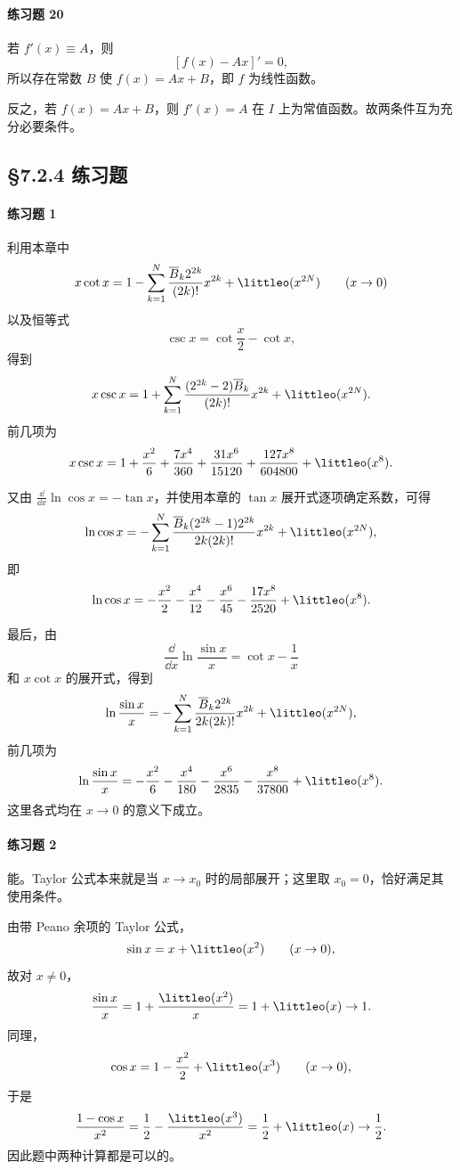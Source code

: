 \paragraph{练习题 20}
\begin{xsolution}
若 $f'(x)\equiv A$，则
\[
  [f(x)-Ax]'=0,
\]
所以存在常数 $B$ 使 $f(x)=Ax+B$，即 $f$ 为线性函数。

反之，若 $f(x)=Ax+B$，则 $f'(x)=A$ 在 $I$ 上为常值函数。故两条件互为充分必要条件。
\end{xsolution}

\subsection*{§7.2.4 练习题}

\paragraph{练习题 1}
\begin{xsolution}
利用本章中
\[
  x\cot x
  =1-\sum_{k=1}^N\frac{\overline B_k2^{2k}}{(2k)!}x^{2k}
  +\littleo(x^{2N})
  \qquad(x\to0)
\]
以及恒等式
\[
  \csc x=\cot\frac x2-\cot x,
\]
得到
\[
  x\csc x
  =1+\sum_{k=1}^N
  \frac{(2^{2k}-2)\overline B_k}{(2k)!}x^{2k}
  +\littleo(x^{2N}).
\]
前几项为
\[
  x\csc x
  =1+\frac{x^2}{6}+\frac{7x^4}{360}
  +\frac{31x^6}{15120}+\frac{127x^8}{604800}
  +\littleo(x^8).
\]

又由 $\frac{\dd}{\dd x}\ln\cos x=-\tan x$，并使用本章的 $\tan x$ 展开式逐项确定系数，可得
\[
  \ln\cos x
  =-\sum_{k=1}^N
  \frac{\overline B_k(2^{2k}-1)2^{2k}}
       {2k(2k)!}x^{2k}
  +\littleo(x^{2N}),
\]
即
\[
  \ln\cos x
  =-\frac{x^2}{2}-\frac{x^4}{12}-\frac{x^6}{45}
  -\frac{17x^8}{2520}+\littleo(x^8).
\]

最后，由
\[
  \frac{\dd}{\dd x}\ln\frac{\sin x}{x}
  =\cot x-\frac1x
\]
和 $x\cot x$ 的展开式，得到
\[
  \ln\frac{\sin x}{x}
  =-\sum_{k=1}^N
  \frac{\overline B_k2^{2k}}{2k(2k)!}x^{2k}
  +\littleo(x^{2N}),
\]
前几项为
\[
  \ln\frac{\sin x}{x}
  =-\frac{x^2}{6}-\frac{x^4}{180}-\frac{x^6}{2835}
  -\frac{x^8}{37800}+\littleo(x^8).
\]
这里各式均在 $x\to0$ 的意义下成立。
\end{xsolution}

\paragraph{练习题 2}
\begin{xsolution}
能。Taylor 公式本来就是当 $x\to x_0$ 时的局部展开；这里取 $x_0=0$，恰好满足其使用条件。

由带 Peano 余项的 Taylor 公式，
\[
  \sin x=x+\littleo(x^2)\qquad(x\to0),
\]
故对 $x\neq0$，
\[
  \frac{\sin x}{x}=1+\frac{\littleo(x^2)}x=1+\littleo(x)\to1.
\]
同理，
\[
  \cos x=1-\frac{x^2}{2}+\littleo(x^3)\qquad(x\to0),
\]
于是
\[
  \frac{1-\cos x}{x^2}
  =\frac12-\frac{\littleo(x^3)}{x^2}
  =\frac12+\littleo(x)\to\frac12.
\]
因此题中两种计算都是可以的。
\end{xsolution}

